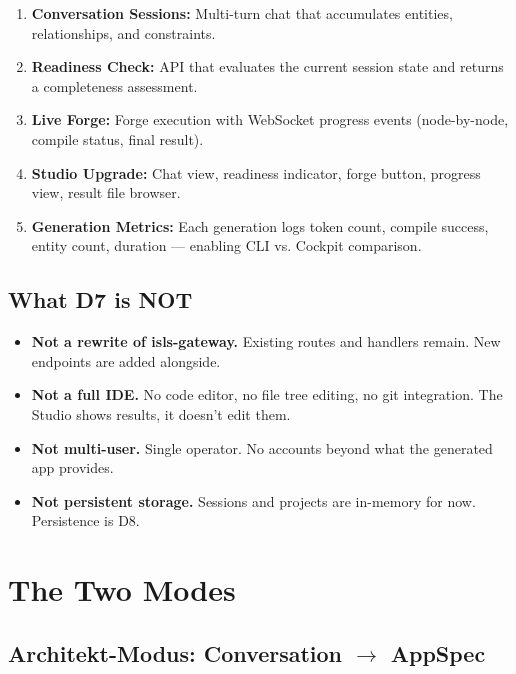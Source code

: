 \documentclass[11pt,a4paper]{article}
\begin{document}
\begin{enumerate}[nosep]
\item \textbf{Conversation Sessions:} Multi-turn chat that 
      accumulates entities, relationships, and constraints.
\item \textbf{Readiness Check:} API that evaluates the current 
      session state and returns a completeness assessment.
\item \textbf{Live Forge:} Forge execution with WebSocket progress 
      events (node-by-node, compile status, final result).
\item \textbf{Studio Upgrade:} Chat view, readiness indicator, 
      forge button, progress view, result file browser.
\item \textbf{Generation Metrics:} Each generation logs token 
      count, compile success, entity count, duration --- enabling 
      CLI vs. Cockpit comparison.
\end{enumerate}

\subsection{What D7 is NOT}

\begin{itemize}[nosep]
\item \textbf{Not a rewrite of isls-gateway.} Existing routes 
      and handlers remain. New endpoints are added alongside.
\item \textbf{Not a full IDE.} No code editor, no file tree 
      editing, no git integration. The Studio shows results, 
      it doesn't edit them.
\item \textbf{Not multi-user.} Single operator. No accounts 
      beyond what the generated app provides.
\item \textbf{Not persistent storage.} Sessions and projects 
      are in-memory for now. Persistence is D8.
\end{itemize}


\section{The Two Modes}

\subsection{Architekt-Modus: Conversation $\to$ AppSpec}
\end{document}
